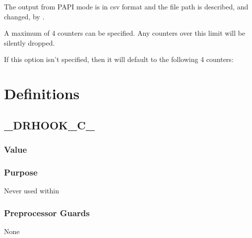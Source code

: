 \documentclass[letterpaper,10pt,english]{sphinxmanual}
\begin{document}
\sphinxAtStartPar
The output from PAPI mode is in csv format and the file path is described, and changed, by {\hyperref[\detokenize{flag/flag:dr-hook-profile}]{}}.

\sphinxAtStartPar
A maximum of 4 counters can be specified. Any counters over this limit will be silently dropped.

\sphinxAtStartPar
If this option isn’t specified, then it will default to the following 4 counters:

\begin{DUlineblock}{0em}
\item[] 
\item[] 
\item[] 
\item[] 
\end{DUlineblock}

\sphinxstepscope


\chapter{Definitions}
\label{\detokenize{definitions/definitions:definitions}}\label{\detokenize{definitions/definitions::doc}}

\section{\_DRHOOK\_C\_}
\label{\detokenize{definitions/definitions:drhook-c}}\label{\detokenize{definitions/definitions:id1}}

\subsection{Value}
\label{\detokenize{definitions/definitions:value}}
\sphinxAtStartPar
{}


\subsection{Purpose}
\label{\detokenize{definitions/definitions:purpose}}
\sphinxAtStartPar
Never used within 


\subsection{Preprocessor Guards}
\label{\detokenize{definitions/definitions:preprocessor-guards}}
\sphinxAtStartPar
None
\end{document}
